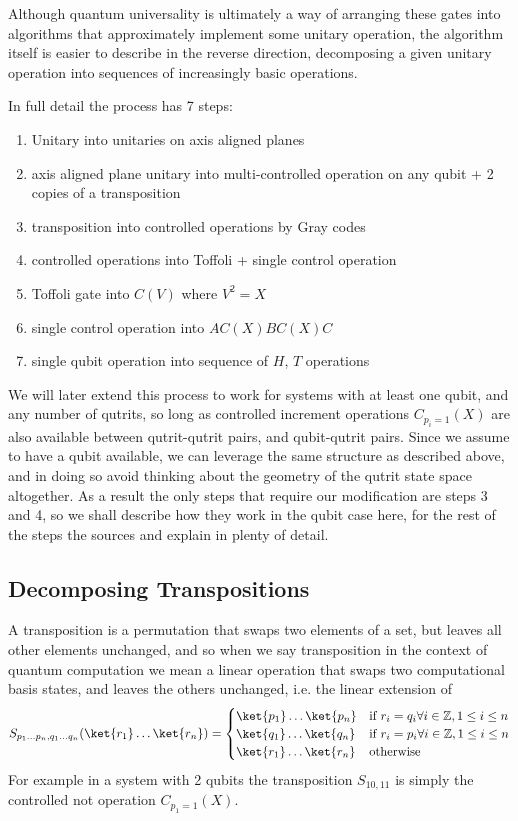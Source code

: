Although quantum universality is ultimately a way of arranging these gates into algorithms that approximately implement some unitary operation, the algorithm itself is easier to describe in the reverse direction, decomposing a given unitary operation into sequences of increasingly basic operations.

In full detail the process has 7 steps:
\begin{enumerate}
	\item Unitary into unitaries on axis aligned planes
	\item axis aligned plane unitary into multi-controlled operation on any qubit + 2 copies of a transposition
	\item transposition into controlled operations by Gray codes
	\item controlled operations into Toffoli + single control operation
	\item Toffoli gate into $C(V)$ where $V^2 = X$
	\item single control operation into $AC(X)BC(X)C$
	\item single qubit operation into sequence of $H$, $T$ operations
\end{enumerate}
We will later extend this process to work for systems with at least one qubit, and any number of qutrits, so long as controlled increment operations $C_{p_i=1}(X)$ are also available between qutrit-qutrit pairs, and qubit-qutrit pairs. Since we assume to have a qubit available, we can leverage the same structure as described above, and in doing so avoid thinking about the geometry of the qutrit state space altogether. As a result the only steps that require our modification are steps 3 and 4, so we shall describe how they work in the qubit case here, for the rest of the steps the sources \cite{textbook} and \cite{universal-qubit} explain in plenty of detail.
\subsection{Decomposing Transpositions}
A transposition is a permutation that swaps two elements of a set, but leaves all other elements unchanged, and so when we say transposition in the context of quantum computation we mean a linear operation that swaps two computational basis states, and leaves the others unchanged, i.e. the linear extension of
\[S_{p_1\dots p_n, q_1\dots q_n}(\ket{r_1}\dots\ket{r_n}) = \begin{cases}
	\ket{p_1}\dots\ket{p_n} & \text{if\ } r_i = q_i \forall i \in \mathbb{Z}, 1 \leq i \leq n \\
	\ket{q_1}\dots\ket{q_n} & \text{if\ } r_i = p_i \forall i \in \mathbb{Z}, 1 \leq i \leq n \\
	\ket{r_1}\dots\ket{r_n} & \text{otherwise}
\end{cases}
\]
For example in a system with 2 qubits the transposition $S_{10,11}$ is simply the controlled not operation $C_{p_1 = 1}(X)$.

